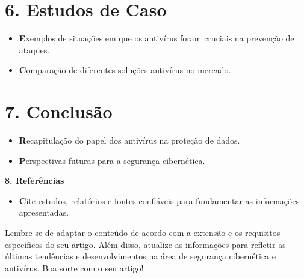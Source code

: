 \documentclass[10pt,conference,twocolumn]{article}
\begin{document}
\section*{6. Estudos de Caso}
 \begin{itemize}
\item \textbf Exemplos de situações em que os antivírus foram cruciais na prevenção de ataques.
\item \textbf Comparação de diferentes soluções antivírus no mercado.
\end{itemize}

\section* {7. Conclusão}
 \begin{itemize}
\item \textbf Recapitulação do papel dos antivírus na proteção de dados.
\item \textbf Perspectivas futuras para a segurança cibernética.
\end{itemize}

\textbf {8. Referências}
 \begin{itemize}
\item \textbf Cite estudos, relatórios e fontes confiáveis para fundamentar as informações apresentadas.
\end{itemize}

Lembre-se de adaptar o conteúdo de acordo com a extensão e os requisitos específicos do seu artigo. Além disso, atualize as informações para refletir as últimas tendências e desenvolvimentos na área de segurança cibernética e antivírus. Boa sorte com o seu artigo!
\end{document}
